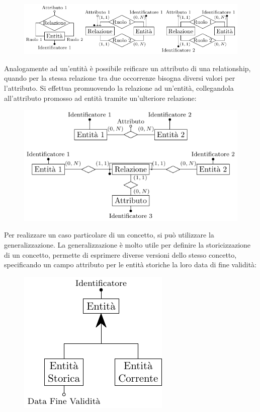\documentclass{article}
\numberwithin{equation}{subsection}
\begin{document}
\begin{figure}[H]%
    \centering%
    \includegraphics[trim={0.4cm 0 0 0},scale=1.2]{reificazione_relationship_ricorsiva.pdf}%
\end{figure}

Analogamente ad un'entità è possibile reificare un attributo di una relationship, 
quando per la stessa relazione tra due occorrenze bisogna diversi valori 
per l'attributo. Si effettua promuovendo la relazione ad un'entità, collegandola 
all'attributo promosso ad entità tramite un'ulteriore relazione:
\begin{figure}[H]%
    \centering%
    \includegraphics[scale=1.25]{reificazione_attributo_relationship.pdf}%
\end{figure}

Per realizzare un caso particolare di un concetto, si può utilizzare la generalizzazione. La 
generalizzazione è molto utile per definire la storicizzazione di un concetto, permette 
di esprimere diverse versioni dello stesso concetto, specificando un campo attributo per 
le entità storiche la loro data di fine validità:

\begin{figure}[H]%
    \centering%
    \includegraphics{storicizzazione_concetto.pdf}%
\end{figure}
\end{document}
